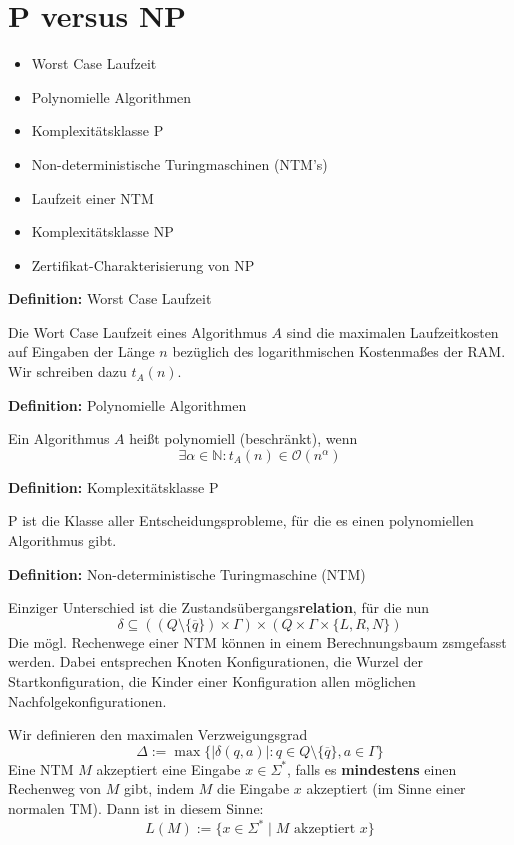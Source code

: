 \documentclass[a4paper,graphics,11pt]{article}
\begin{document}
\newpage



\section{P versus NP}

\begin{itemize}
    \item Worst Case Laufzeit
    \item Polynomielle Algorithmen
    \item Komplexitätsklasse \textsf{P}
    \item Non-deterministische Turingmaschinen (NTM's)
    \item Laufzeit einer NTM
    \item Komplexitätsklasse \textsf{NP}
    \item Zertifikat-Charakterisierung von \textsf{NP}
\end{itemize}

\textbf{Definition:} Worst Case Laufzeit

Die Wort Case Laufzeit eines Algorithmus $A$ sind die maximalen Laufzeitkosten
auf Eingaben der Länge $n$ bezüglich des logarithmischen Kostenmaßes der RAM.
Wir schreiben dazu $t_A(n)$.

\strut

\textbf{Definition:} Polynomielle Algorithmen

Ein Algorithmus $A$ heißt polynomiell (beschränkt), wenn
$$
    \exists \alpha \in \mathbb{N}: t_A(n) \in \mathcal{O}(n^\alpha)
$$

\strut

\textbf{Definition:} Komplexitätsklasse \textsf{P}

\textsf{P} ist die Klasse aller Entscheidungsprobleme, für die es einen polynomiellen
Algorithmus gibt.

\strut

\textbf{Definition:} Non-deterministische Turingmaschine (NTM)

Einziger Unterschied ist die Zustandsübergangs\textbf{relation}, für die nun
$$
    \delta \subseteq ((Q\setminus \{\overline{q}\}) \times \Gamma) \times (Q \times \Gamma \times \{L,R,N\})
$$
Die mögl. Rechenwege einer NTM können in einem Berechnungsbaum zsmgefasst werden.
Dabei entsprechen Knoten Konfigurationen, die Wurzel der Startkonfiguration,
die Kinder einer Konfiguration allen möglichen Nachfolgekonfigurationen.

Wir definieren den maximalen Verzweigungsgrad
$$
    \Delta := \max\{|\delta(q,a)| : q \in Q \setminus \{\overline{q}\}, a \in \Gamma\}
$$
Eine NTM $M$ akzeptiert eine Eingabe $x \in \Sigma^*$,
falls es \textbf{mindestens} einen Rechenweg von $M$ gibt,
indem $M$ die Eingabe $x$ akzeptiert (im Sinne einer normalen TM). Dann ist in diesem Sinne:
$$
    L(M) := \{x \in \Sigma^* \mid M \text{ akzeptiert } x\}
$$
\end{document}
